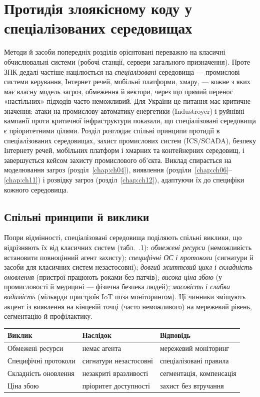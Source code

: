 \chapter{Протидія злоякісному коду у спеціалізованих середовищах}
\label{chap:ch14}

Методи й засоби попередніх розділів орієнтовані переважно на класичні обчислювальні системи (робочі станції, сервери загального призначення). Проте ЗПК дедалі частіше націлюється на \emph{спеціалізовані} середовища --- промислові системи керування, Інтернет речей, мобільні платформи, хмару, --- кожне з яких має власну модель загроз, обмеження й вектори, через що прямий перенос «настільних» підходів часто неможливий. Для України це питання має критичне значення: атаки на промислову автоматику енергетики (Industroyer) і руйнівні кампанії проти критичної інфраструктури показали, що спеціалізовані середовища є пріоритетними цілями. Розділ розглядає спільні принципи протидії в спеціалізованих середовищах, захист промислових систем (ICS/SCADA), безпеку Інтернету речей, мобільних платформ і хмарних та контейнерних середовищ, і завершується кейсом захисту промислового об'єкта. Виклад спирається на моделювання загроз (розділ~\ref{chap:ch04}), виявлення (розділи~\ref{chap:ch06}--\ref{chap:ch11}) і розвідку загроз (розділ~\ref{chap:ch12}), адаптуючи їх до специфіки кожного середовища.

\section{Спільні принципи й виклики}\label{sec:ch14-common}

Попри відмінності, спеціалізовані середовища поділяють спільні виклики, що відрізняють їх від класичних систем (табл.~\thechapter.1): \emph{обмежені ресурси} (неможливість встановити повноцінний агент захисту); \emph{специфічні ОС і протоколи} (сигнатури й засоби для класичних систем незастосовні); \emph{довгий життєвий цикл і складність оновлення} (пристрої працюють роками без патчів); \emph{висока ціна збою} (у промисловості й медицині --- фізична безпека людей); \emph{масовість і слабка видимість} (мільярди пристроїв IoT поза моніторингом). Ці чинники зміщують акцент із виявлення на кінцевій точці (часто неможливого) на мережевий рівень, сегментацію й профілактику.


\begin{center}\footnotesize
\begin{tabularx}{\linewidth}{L{22mm} Y L{22mm}}
\toprule
Виклик & Наслідок & Відповідь \\
\midrule
Обмежені ресурси & немає агента & мережевий моніторинг \\
Специфічні протоколи & сигнатури незастосовні & спеціалізовані правила \\
Складність оновлення & незакриті вразливості & сегментація, компенсація \\
Ціна збою & пріоритет доступності & захист без втручання \\
\bottomrule
\end{tabularx}
\end{center}

